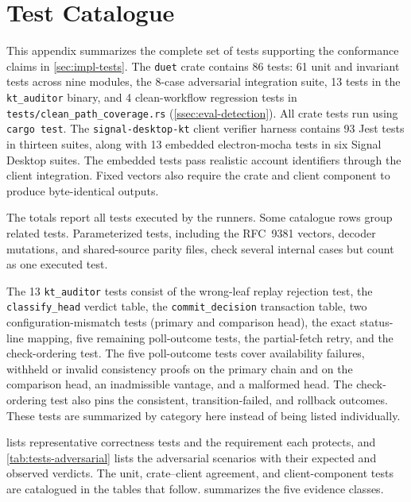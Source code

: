 \chapter{Test Catalogue}\label{app:tests}

This appendix summarizes the complete set of tests supporting the conformance claims in
\cref{sec:impl-tests}. The \texttt{duet} crate contains \num{86} tests: \num{61} unit and invariant
tests across nine modules, the \num{8}-case adversarial integration suite, \num{13} tests in the
\texttt{kt\_auditor} binary, and \num{4} clean-workflow regression tests in
\texttt{tests/clean\_path\_coverage.rs} (\cref{ssec:eval-detection}). All crate tests run using
\texttt{cargo test}. The \texttt{signal-desktop-kt} client verifier harness contains \num{93} Jest
tests in thirteen suites, along with \num{13} embedded electron-mocha tests in six Signal Desktop
suites. The embedded tests pass realistic account identifiers through the client integration. Fixed
vectors also require the crate and client component to produce byte-identical outputs.

The totals report all tests executed by the runners. Some catalogue rows group related tests.
Parameterized tests, including the RFC~9381 vectors, decoder mutations, and shared-source parity
files, check several internal cases but count as one executed test.

The \num{13} \texttt{kt\_auditor} tests consist of the wrong-leaf replay rejection test, the
\texttt{classify\_head} verdict table, the \texttt{commit\_decision} transaction table, two
configuration-mismatch tests (primary and comparison head), the exact status-line mapping, five
remaining poll-outcome tests, the partial-fetch retry, and the check-ordering test. The five
poll-outcome tests cover availability failures, withheld or invalid consistency proofs on the
primary chain and on the comparison head, an inadmissible vantage, and a malformed head. The
check-ordering test also pins the consistent, transition-failed, and rollback outcomes. These tests
are summarized by category here instead of being listed individually.

 lists representative correctness tests and the requirement each protects, and
\cref{tab:tests-adversarial} lists the adversarial scenarios with their expected and observed
verdicts. The unit, crate--client agreement, and client-component tests are catalogued in the tables
that follow.  summarizes the five evidence classes.

